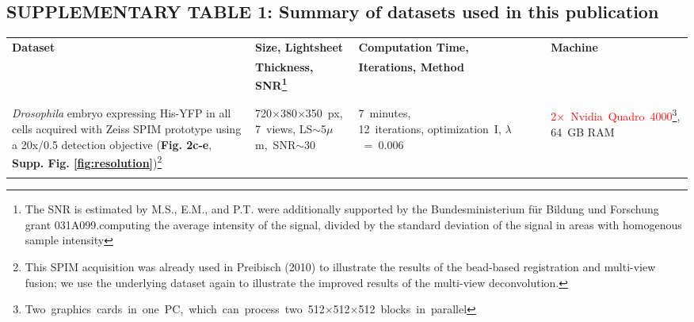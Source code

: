 \documentclass[]{spie}  %
\begin{document}
\hspace{20mm}

\subsection*{SUPPLEMENTARY TABLE 1: Summary of datasets used in this publication}

\hspace{20mm}

\setcounter{table}{0}

\begin{savenotes}
\begin{table}[h!]
\center
{
\fontsize{9pt}{10pt}\selectfont
\center
\begin{tabular}{p{5.5cm}p{3.0cm}p{3.6cm}p{3.5cm}}
\textbf{Dataset} & \textbf{Size, Lightsheet} & \textbf{Computation Time,} & \textbf{Machine}\\
 & \textbf{Thickness, SNR\footnote{The SNR is estimated by M.S., E.M., and P.T. were additionally supported by the Bundesministerium für Bildung und Forschung grant 031A099.computing the average intensity of the signal, divided by the standard deviation of the signal in areas with homogenous sample intensity}}  &\textbf{Iterations, Method} &  \\
\\
\hline
\\
\emph{Drosophila} embryo expressing His-YFP in all cells  acquired with Zeiss SPIM prototype using a 20x/0.5 detection objective (\textbf{Fig. 2c-e}, \textbf{Supp. Fig. \ref{fig:resolution}})\setcounter{savecntr1}{\value{footnote}}\footnote{This SPIM acquisition was already used in Preibisch (2010)\cite{Preibisch2010} to illustrate the results of the bead-based registration and multi-view fusion; we use the underlying dataset again to illustrate the improved results of the multi-view deconvolution.} & \mbox{720$\times$380$\times$350~px}, \mbox{7~views}, \mbox{LS$\sim$5$\mu$m, SNR$\sim$30} & \mbox{7~minutes,~~~~~~~~~~~~~~~~} \mbox{12 iterations}, \mbox{optimization I}, $\lambda$~=~0.006 & \mbox{\textcolor{red}{2$\times$~Nvidia~Quadro~4000}\setcounter{savecntr2}{\value{footnote}}\footnote{Two graphics cards in one PC, which can process two 512$\times$512$\times$512 blocks in parallel}}, 64~GB RAM\\
\\

\end{tabular}}
\end{table}
\end{savenotes}
\end{document}
